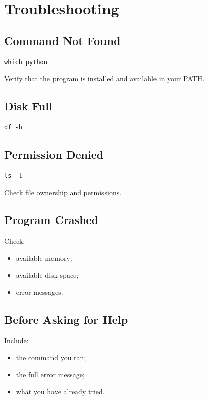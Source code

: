 \section{Troubleshooting}

\subsection{Command Not Found}

\begin{lstlisting}
which python
\end{lstlisting}

Verify that the program is installed and available in your PATH.

\subsection{Disk Full}

\begin{lstlisting}
df -h
\end{lstlisting}

\subsection{Permission Denied}

\begin{lstlisting}
ls -l
\end{lstlisting}

Check file ownership and permissions.

\subsection{Program Crashed}

Check:

\begin{itemize}
\item available memory;
\item available disk space;
\item error messages.
\end{itemize}

\subsection{Before Asking for Help}

Include:

\begin{itemize}
\item the command you ran;
\item the full error message;
\item what you have already tried.
\end{itemize}
